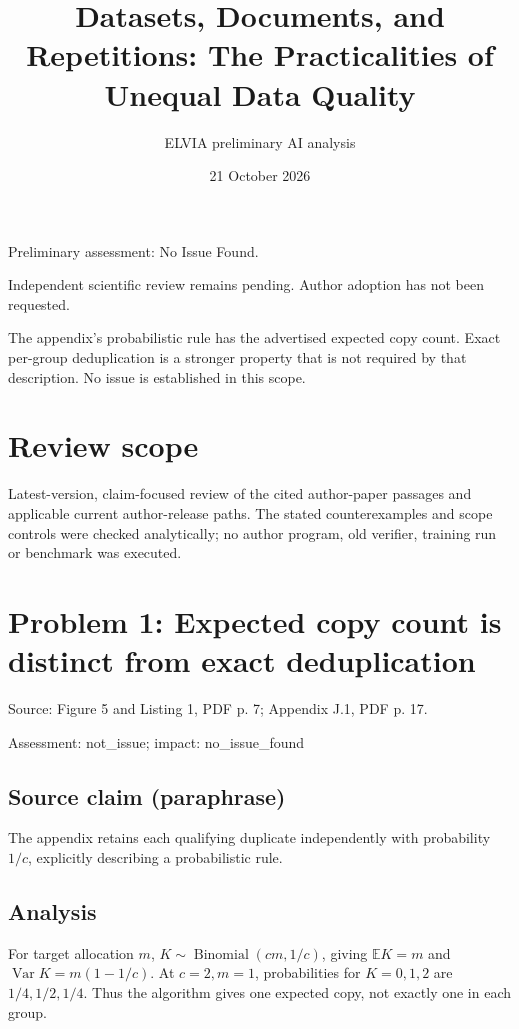 \documentclass[11pt]{article}
\begin{document}
\title{Datasets, Documents, and Repetitions: The Practicalities of Unequal Data Quality}

\author{ELVIA preliminary AI analysis}\date{21 October 2026}\maketitle

Preliminary assessment: No Issue Found.\par

Independent scientific review remains pending. Author adoption has not been requested.

The appendix's probabilistic rule has the advertised expected copy count. Exact per-group deduplication is a stronger property that is not required by that description. No issue is established in this scope.

\section*{Review scope}

Latest-version, claim-focused review of the cited author-paper passages and applicable current author-release paths. The stated counterexamples and scope controls were checked analytically; no author program, old verifier, training run or benchmark was executed.

\section*{Problem 1: Expected copy count is distinct from exact deduplication}

Source: Figure 5 and Listing 1, PDF p. 7; Appendix J.1, PDF p. 17.

Assessment: not\_issue; impact: no\_issue\_found

\subsection*{Source claim (paraphrase)}

The appendix retains each qualifying duplicate independently with probability \(1/c\), explicitly describing a probabilistic rule.

\subsection*{Analysis}

For target allocation \(m\), \(K\sim\operatorname{Binomial}(cm,1/c)\), giving \(\mathbb EK=m\) and \(\operatorname{Var}K=m(1-1/c)\). At \(c=2,m=1\), probabilities for \(K=0,1,2\) are \(1/4,1/2,1/4\). Thus the algorithm gives one expected copy, not exactly one in each group.
\end{document}
